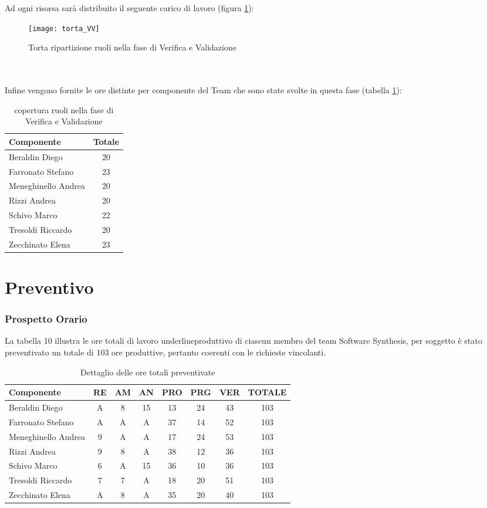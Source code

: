 \clearpage
Ad ogni risorsa sarà distribuito il seguente carico di lavoro (figura \ref{fig:ruolivv}):\\
\begin{figure}[h!]
\centering
  \texttt{[image: torta\_VV]}
\caption{Torta ripartizione ruoli nella fase di Verifica e Validazione}\label{fig:ruolivv}
\end{figure}
\\\\
Infine vengono fornite le ore distinte per componente del Team che sono state svolte in questa fase (tabella \ref{tab:ruolivv2}):\\
\begin{table}[h]
\centering
\begin{tabular}{|l|c|}
\hline
Componente& Totale \\
\hline
Beraldin Diego & 20\\
Farronato Stefano & 23\\
Meneghinello Andrea & 20\\
Rizzi Andrea & 20\\
Schivo Marco & 22\\
Tresoldi Riccardo & 20\\
Zecchinato Elena & 23\\
\hline
\end{tabular}
\caption{copertura ruoli nella fase di Verifica e Validazione}\label{tab:ruolivv2}
\end{table}
\clearpage
\section{Preventivo}
\subsubsection{Prospetto Orario}
La tabella 10 illustra le ore totali di lavoro underline{produttivo} di ciascun membro del team Software Synthesis, per soggetto è stato preventivato un totale di 103 ore produttive, pertanto coerenti con le richieste vincolanti.
\begin{table}[h]
\centering
\begin{tabular}{|l|c|c|c|c|c|c|c|}
\hline
Componente& RE& AM& AN& PRO& PRG& VER& TOTALE\\
\hline
Beraldin Diego & A& 8& 15& 13& 24& 43& 103\\
Farronato Stefano & A& A& A& 37& 14& 52&  103\\
Meneghinello Andrea & 9& A& A& 17& 24& 53& 103\\
Rizzi Andrea & 9& 8& A& 38& 12& 36& 103\\
Schivo Marco & 6& A& 15& 36& 10& 36& 103\\
Tresoldi Riccardo & 7& 7& A& 18& 20& 51& 103\\
Zecchinato Elena & A& 8& A& 35& 20& 40& 103\\
\hline
\end{tabular}
\caption{Dettaglio delle ore totali preventivate}\label{tab:oretotali}
\end{table}

